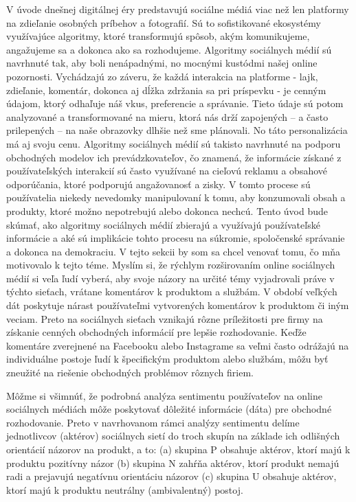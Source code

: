 \documentclass[12pt,twoside,slovak,a4paper]{article}
\begin{document}
V úvode dnešnej digitálnej éry predstavujú sociálne médiá viac než len platformy na zdieľanie osobných príbehov a fotografií. Sú to sofistikované ekosystémy využívajúce algoritmy, ktoré transformujú spôsob, akým komunikujeme, angažujeme sa a dokonca ako sa rozhodujeme. Algoritmy sociálnych médií sú navrhnuté tak, aby boli nenápadnými, no mocnými kustódmi našej online pozornosti. Vychádzajú zo záveru, že každá interakcia na platforme - lajk, zdieľanie, komentár, dokonca aj dĺžka zdržania sa pri príspevku - je cenným údajom, ktorý odhaľuje náš vkus, preferencie a správanie. Tieto údaje sú potom analyzované a transformované na mieru, ktorá nás drží zapojených – a často prilepených – na naše obrazovky dlhšie než sme plánovali.
No táto personalizácia má aj svoju cenu. Algoritmy sociálnych médií sú takisto navrhnuté na podporu obchodných modelov ich prevádzkovateľov, čo znamená, že informácie získané z používateľských interakcií sú často využívané na cieľovú reklamu a obsahové odporúčania, ktoré podporujú angažovanosť a zisky. V tomto procese sú používatelia niekedy nevedomky manipulovaní k tomu, aby konzumovali obsah a produkty, ktoré možno nepotrebujú alebo dokonca nechcú. Tento úvod bude skúmať, ako algoritmy sociálnych médií zbierajú a využívajú používateľské informácie a aké sú implikácie tohto procesu na súkromie, spoločenské správanie a dokonca na demokraciu. V tejto sekcii by som sa chcel venovať tomu, čo mňa motivovalo k tejto téme. Myslím si, že rýchlym rozširovaním online sociálnych médií si veľa ľudí vyberá, aby svoje názory na určité témy vyjadrovali práve v týchto sieťach, vrátane komentárov k produktom a službám. V období veľkých dát poskytuje nárast používateľmi vytvorených komentárov k produktom či iným veciam. Preto na sociálnych sieťach vznikajú rôzne príležitosti pre firmy na získanie cenných obchodných informácií pre lepšie rozhodovanie. Keďže komentáre zverejnené na Facebooku alebo Instagrame sa veľmi často odrážajú na individuálne postoje ľudí k špecifickým produktom alebo službám, môžu byť zneužité na riešenie obchodných problémov rôznych firiem. 

Môžme si všimnúť, že podrobná analýza sentimentu používateľov na online sociálnych médiách môže poskytovať dôležité informácie (dáta) pre obchodné rozhodovanie. Preto v navrhovanom rámci analýzy sentimentu delíme jednotlivcov (aktérov) sociálnych sietí do troch skupín na základe ich odlišných orientácií názorov na produkt, a to: 
(a) skupina P obsahuje aktérov, ktorí majú k produktu pozitívny názor
(b) skupina N zahŕňa aktérov, ktorí produkt nemajú radi a prejavujú negatívnu orientáciu názorov
(c) skupina U obsahuje aktérov, ktorí majú k produktu neutrálny (ambivalentný) postoj.
\cite{7809906}
\end{document}
